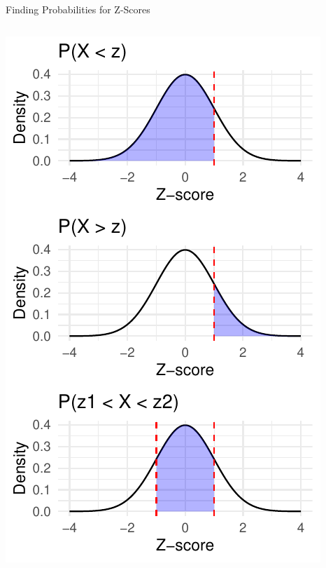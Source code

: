 \documentclass[
  ignorenonframetext,
]{beamer}
\begin{document}
\begin{frame}{Finding Probabilities for Z-Scores}
\begin{columns}[T]
\begin{column}{0.48\textwidth}
\includegraphics{M5-Hypothesis-Testing,-Probability-and-Distributions_files/figure-beamer/unnamed-chunk-2-1.pdf}
\end{column}
\end{columns}
\end{frame}
\end{document}
